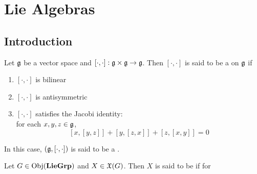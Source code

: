 \documentclass{book}
\begin{document}
\newpage
\chapter{Lie Algebras}

\section{Introduction}

\begin{defn}
	Let $\mathfrak{g}$ be a vector space and $[\cdot, \cdot]: \mathfrak{g} \times \mathfrak{g} \rightarrow \mathfrak{g}$. 
	Then $[\cdot, \cdot]$ is said to be a  on $\mathfrak{g}$ if  
	\begin{enumerate}
		\item $[\cdot, \cdot]$ is bilinear
		\item $[\cdot, \cdot]$ is antisymmetric
		\item $[\cdot, \cdot]$ satisfies the Jacobi identity: \\
		for each $x, y, z \in \mathfrak{g}$, 
		$$[x, [y,z]] + [y, [z,x]] + [z, [x,y]] = 0$$
	\end{enumerate}
	In this case, $(\mathfrak{g}, [\cdot, \cdot])$ is said to be a .
\end{defn}

\begin{defn}
	Let $G \in \operatorname{Obj}(\operatorname*{\text{\textbf{LieGrp}}})$ and $X \in \mathfrak{X}(G)$. Then $X$ is said to be  if for 
\end{defn}
\end{document}
